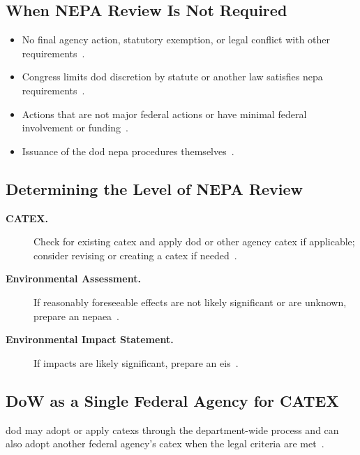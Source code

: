 \documentclass[../main.tex]{subfiles}
\begin{document}
\subsection{When NEPA Review Is Not Required}
\begin{itemize}
  \item No final agency action, statutory exemption, or legal conflict with other requirements~\autocite{edo-3-3-7-environmental-requirements-2025}.
  \item Congress limits \ac{dod} discretion by statute or another law satisfies \ac{nepa} requirements~\autocite{edo-3-3-7-environmental-requirements-2025}.
  \item Actions that are not major federal actions or have minimal federal involvement or funding~\autocite{edo-3-3-7-environmental-requirements-2025}.
  \item Issuance of the \ac{dod} \ac{nepa} procedures themselves~\autocite{edo-3-3-7-environmental-requirements-2025}.
\end{itemize}

\subsection{Determining the Level of NEPA Review}
\begin{description}
  \item[\textbf{CATEX.}] Check for existing \ac{catex} and apply \ac{dod} or other agency \ac{catex} if applicable; consider revising or creating a \ac{catex} if needed~\autocite{edo-3-3-7-environmental-requirements-2025}.
  \item[\textbf{Environmental Assessment.}] If reasonably foreseeable effects are not likely significant or are unknown, prepare an \ac{nepaea}~\autocite{edo-3-3-7-environmental-requirements-2025}.
  \item[\textbf{Environmental Impact Statement.}] If impacts are likely significant, prepare an \ac{eis}~\autocite{edo-3-3-7-environmental-requirements-2025}.
\end{description}

\subsection{DoW as a Single Federal Agency for CATEX}
\ac{dod} may adopt or apply \acp{catex} through the department-wide process and can also adopt another
federal agency's \ac{catex} when the legal criteria are met~\autocite{DoD-NEPA-Procedures-2025,edo-3-3-7-environmental-requirements-2025}.
\end{document}

